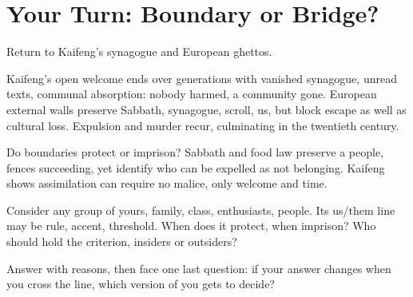 \section{Your Turn: Boundary or Bridge?}
Return to Kaifeng's synagogue and European ghettos.

Kaifeng's open welcome ends over generations with vanished synagogue, unread texts, communal absorption: nobody harmed, a community gone. European external walls preserve Sabbath, synagogue, scroll, us, but block escape as well as cultural loss. Expulsion and murder recur, culminating in the twentieth century.

Do boundaries protect or imprison? Sabbath and food law preserve a people, fences succeeding, yet identify who can be expelled as not belonging. Kaifeng shows assimilation can require no malice, only welcome and time.

Consider any group of yours, family, class, enthusiasts, people. Its us/them line may be rule, accent, threshold. When does it protect, when imprison? Who should hold the criterion, insiders or outsiders?

Answer with reasons, then face one last question: if your answer changes when you cross the line, which version of you gets to decide?
